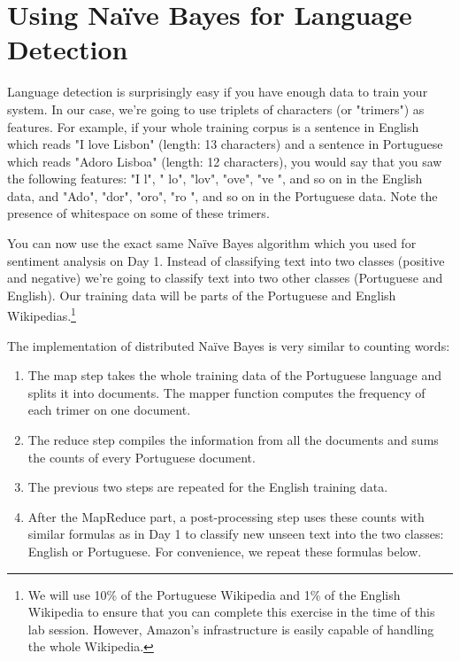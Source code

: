 \section{Using Na\"{i}ve Bayes for Language Detection}

Language detection is surprisingly easy if you have enough data to train your system. In our case, we're going to use triplets of characters (or "trimers") as features. For example, if your whole training corpus is a sentence in English which reads "I love Lisbon" (length: 13 characters) and a sentence in Portuguese which reads "Adoro Lisboa" (length: 12 characters), you would say that you saw the following features: "I l", " lo", "lov", "ove", "ve ", and so on in the English data, and "Ado", "dor", "oro", "ro ", and so on in the Portuguese data. Note the presence of whitespace on some of these trimers.

You can now use the exact same Na\"{i}ve Bayes algorithm which you used for sentiment analysis on Day 1. Instead of classifying text into two classes (positive and negative) we're going to classify text into two other classes (Portuguese and English). Our training data will be parts of the Portuguese and English Wikipedias.\footnote{We will use 10\% of the Portuguese Wikipedia and 1\% of the English Wikipedia to ensure that you can complete this exercise in the time of this lab session. However, Amazon's infrastructure is easily capable of handling the whole Wikipedia.}

The implementation of distributed Na\"{i}ve Bayes is very similar to counting words:
\begin{enumerate}
	\item The map step takes the whole training data of the Portuguese language and splits it into documents. The mapper function computes the frequency of each trimer on one document.
	\item The reduce step compiles the information from all the documents and sums the counts of every Portuguese document.
	\item The previous two steps are repeated for the English training data.
	\item After the MapReduce part, a post-processing step uses these counts with similar formulas as in Day 1 to classify new unseen text into the two classes: English or Portuguese. For convenience, we repeat these formulas below.
\end{enumerate}

